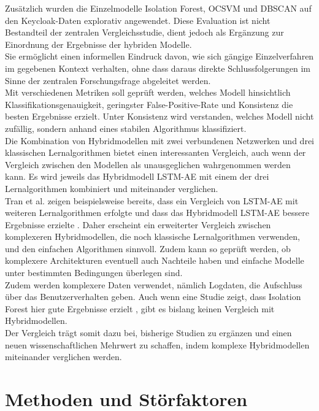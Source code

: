 \documentclass[a4paper,12pt]{article}
\begin{document}
	Zusätzlich wurden die Einzelmodelle Isolation Forest, OCSVM und DBSCAN auf den Keycloak-Daten explorativ angewendet. Diese Evaluation ist nicht Bestandteil der zentralen Vergleichsstudie, dient jedoch als Ergänzung zur Einordnung der Ergebnisse der hybriden Modelle.
	\\[0.5em]
	Sie ermöglicht einen informellen Eindruck davon, wie sich gängige Einzelverfahren im gegebenen Kontext verhalten, ohne dass daraus direkte Schlussfolgerungen im Sinne der zentralen Forschungsfrage abgeleitet werden.
	\\[0.5em]
	Mit verschiedenen Metriken soll geprüft werden, welches Modell hinsichtlich Klassifikationsgenauigkeit, geringster False-Positive-Rate und Konsistenz die besten Ergebnisse erzielt. Unter Konsistenz wird verstanden, welches Modell nicht zufällig, sondern anhand eines stabilen Algorithmus klassifiziert.
	\\[0.5em]
	Die Kombination von Hybridmodellen mit zwei verbundenen Netzwerken und drei klassischen Lernalgorithmen bietet einen interessanten Vergleich, auch wenn der Vergleich zwischen den Modellen als unausgeglichen wahrgenommen werden kann. Es wird jeweils das Hybridmodell LSTM-AE mit einem der drei Lernalgorithmen kombiniert und miteinander verglichen.
	\\[0.5em]
	Tran et al. zeigen beispielsweise bereits, dass ein Vergleich von LSTM-AE mit weiteren Lernalgorithmen erfolgte und dass das Hybridmodell LSTM-AE bessere Ergebnisse erzielte \cite{tran2021forecasting}. Daher erscheint ein erweiterter Vergleich zwischen komplexeren Hybridmodellen, die noch klassische Lernalgorithmen verwenden, und den einfachen Algorithmen sinnvoll. Zudem kann so geprüft werden, ob komplexere Architekturen eventuell auch Nachteile haben und einfache Modelle unter bestimmten Bedingungen überlegen sind.
	\\[0.5em]
	Zudem werden komplexere Daten verwendet, nämlich Logdaten, die Aufschluss über das Benutzerverhalten geben. Auch wenn eine Studie zeigt, dass Isolation Forest hier gute Ergebnisse erzielt \cite{yan2021extended}, gibt es bislang keinen Vergleich mit Hybridmodellen.
	\\[0.5em]
	Der Vergleich trägt somit dazu bei, bisherige Studien zu ergänzen und einen neuen wissenschaftlichen Mehrwert zu schaffen, indem komplexe Hybridmodellen miteinander verglichen werden.
	
	\section{Methoden und Störfaktoren}
\end{document}

